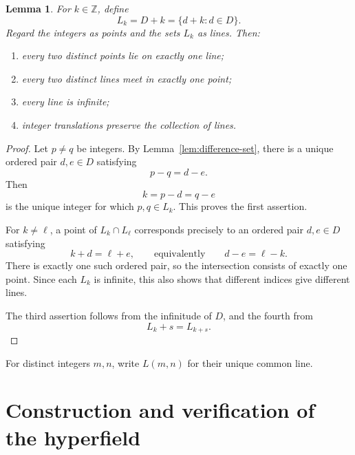 \documentclass[11pt]{article}
\newcommand{\ZZ}{\mathbb{Z}}
\newtheorem{lemma}[theorem]{Lemma}
\begin{document}
\begin{lemma}\label{lem:incidence}
For \(k\in\ZZ\), define
\[
    L_k=D+k=\{d+k:d\in D\}.
\]
Regard the integers as points and the sets \(L_k\) as lines. Then:
\begin{enumerate}
    \item every two distinct points lie on exactly one line;
    \item every two distinct lines meet in exactly one point;
    \item every line is infinite;
    \item integer translations preserve the collection of lines.
\end{enumerate}
\end{lemma}
\begin{proof}
Let \(p\neq q\) be integers. By Lemma~\ref{lem:difference-set}, there is a
unique ordered pair \(d,e\in D\) satisfying
\[
    p-q=d-e.
\]
Then
\[
    k=p-d=q-e
\]
is the unique integer for which \(p,q\in L_k\). This proves the first
assertion.

For \(k\neq \ell\), a point of \(L_k\cap L_\ell\) corresponds precisely to
an ordered pair \(d,e\in D\) satisfying
\[
    k+d=\ell+e,
    \qquad\text{equivalently}\qquad
    d-e=\ell-k.
\]
There is exactly one such ordered pair, so the intersection consists of
exactly one point. Since each \(L_k\) is infinite, this also shows that
different indices give different lines.

The third assertion follows from the infinitude of \(D\), and the fourth
from
\[
    L_k+s=L_{k+s}.
\]
\end{proof}

For distinct integers \(m,n\), write \(L(m,n)\) for their unique common
line.

\section{Construction and verification of the hyperfield}
\end{document}

